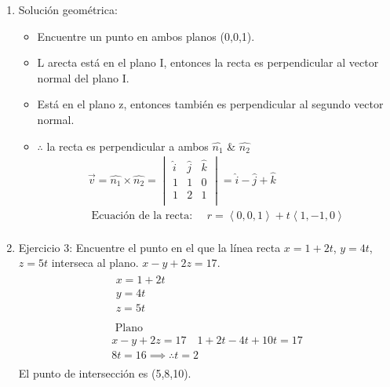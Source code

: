 \documentclass{article}
\begin{document}
\begin{enumerate}
    \item Solución geométrica:
        \begin{itemize}
            \item Encuentre un punto en ambos planos (0,0,1).
            \item L arecta está en el plano I, entonces la recta es perpendicular al vector normal del plano I.
            \item Está en el plano z, entonces también es perpendicular al segundo vector normal.
            \item $\therefore $ la recta es perpendicular a ambos $\hat{n_1}$ \& $\hat{n_2}$
                \begin{align*}
                    \vec{v} = \hat{n_1} \times \hat{n_2} = \begin{vmatrix}
                        \hat{i} & \hat{j} & \hat{k} \\ 
                        1 & 1 & 0 \\ 
                        1 & 2 & 1 \\ 
                    \end{vmatrix} = \hat{i} - \hat{j} + \hat{k} \\ 
                    \text{  Ecuación de la recta:  } \quad r = \left\langle 0,0,1 \right\rangle + t \left\langle 1,-1,0 \right\rangle \\ 
                \end{align*}
        \end{itemize}
    
    \item Ejercicio 3: Encuentre el punto en el que la línea recta $x=1+2t$, $y=4t$, $z=5t$ interseca al plano. $x-y+2z=17$.
        \begin{align*}
            \begin{matrix}
                x = 1+2t \\ 
                y = 4t \\ 
                z= 5t \\ 
            \end{matrix} \\ 
            \text{  Plano  } \\ 
            x-y+2z = 17 \quad 1+2t-4t+10t = 17 \\ 
            8t = 16 \implies \therefore  t = 2 \\ 
        \end{align*}
        El punto de intersección es (5,8,10).
    

\end{enumerate}
\end{document}

